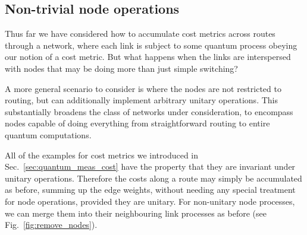%
%

\subsection{Non-trivial node operations}

Thus far we have considered how to accumulate cost metrics across routes through a network, where each link is subject to some quantum process obeying our notion of a cost metric. But what happens when the links are interspersed with nodes that may be doing more than just simple switching?

A more general scenario to consider is where the nodes are not restricted to routing, but can additionally implement arbitrary unitary operations. This substantially broadens the class of networks under consideration, to encompass nodes capable of doing everything from straightforward routing to entire quantum computations.

All of the examples for cost metrics we introduced in Sec.~\ref{sec:quantum_meas_cost} have the property that they are invariant under unitary operations. Therefore the costs along a route may simply be accumulated as before, summing up the edge weights, without needing any special treatment for node operations, provided they are unitary. For non-unitary node processes, we can merge them into their neighbouring link processes as before (see Fig.~\ref{fig:remove_nodes}).